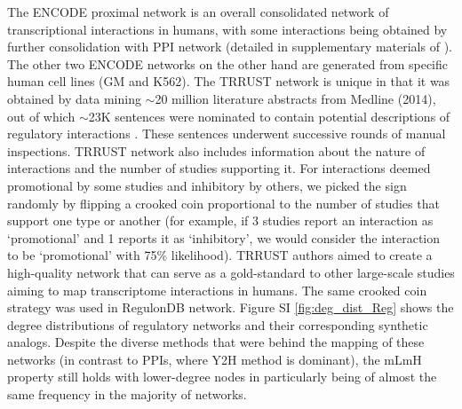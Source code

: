 \documentclass[12pt]{article}	%
\begin{document}
    The ENCODE proximal network is an overall consolidated network of transcriptional interactions in humans, with some interactions being obtained by further consolidation with PPI network (detailed in supplementary materials of  \cite{gerstein_architecture_2012}). The other two ENCODE networks on the other hand are generated from specific human cell lines (GM and K562). The TRRUST network is unique in that it was obtained by data mining ${\sim}$20 million literature abstracts from  Medline (2014), out of which ${\sim}$23K sentences were nominated to contain potential descriptions of regulatory interactions  \cite{han_trrust:_2015}. These sentences underwent successive rounds of manual inspections. TRRUST network also includes information about the nature of interactions and the number of studies supporting it. For interactions deemed promotional by some studies and inhibitory by others, we picked the sign randomly by flipping a crooked coin proportional to the number of studies that support one type or another (for example, if 3 studies report an interaction as `promotional' and 1 reports it as `inhibitory', we would consider the interaction to be `promotional' with 75\% likelihood). TRRUST authors aimed to create a high-quality network that can serve as a gold-standard to other large-scale studies aiming to map transcriptome interactions in humans. The same crooked coin strategy was used in RegulonDB network. Figure SI \ref{fig:deg_dist_Reg} shows the degree distributions of regulatory networks and their corresponding synthetic analogs. Despite the diverse methods that were behind the mapping of these networks (in contrast to PPIs, where Y2H method is dominant), the mLmH property still holds with lower-degree nodes in particularly being of almost the same frequency in the majority of networks.
    \newpage
\end{document}

